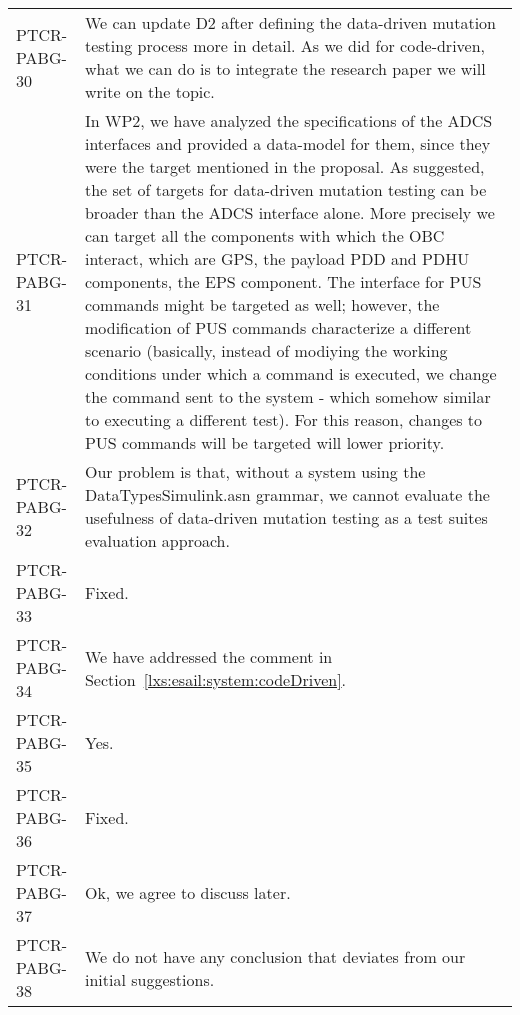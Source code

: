 \begin{longtable}{|p{1.5cm}|p{12cm}|@{}}
\begin{minipage}{12cm}
\end{minipage}\\
\hline
PTCR-PABG-30&
\begin{minipage}{12cm}
We can update D2 after defining the data-driven mutation testing process more in detail. As we did for code-driven, what we can do is to integrate the research paper we will write on the topic.
\end{minipage}\\
\hline
PTCR-PABG-31&
\begin{minipage}{12cm}
In WP2, we have analyzed the specifications of the ADCS interfaces and provided a data-model for them, since they were the target mentioned in the proposal. As suggested, the set of targets for data-driven mutation testing can be broader than the ADCS interface alone. More precisely we can target all the components with which the OBC interact, which are GPS, the payload PDD and PDHU components, the EPS component. The interface for PUS commands might be targeted as well; however, the modification of PUS commands characterize a different scenario (basically,  instead of modiying the working conditions under which a command is executed, we change the command sent to the system - which somehow similar to executing a different test). For this reason, changes to PUS commands will be targeted will lower priority.
\end{minipage}\\
\hline
PTCR-PABG-32&
\begin{minipage}{12cm}
Our problem is that, without a system using the DataTypesSimulink.asn grammar, we cannot evaluate the usefulness of data-driven mutation testing as a test suites evaluation approach.
\end{minipage}\\
\hline
PTCR-PABG-33&
\begin{minipage}{12cm}
Fixed.
\end{minipage}\\
\hline
PTCR-PABG-34&
\begin{minipage}{12cm}
We have addressed the comment in Section~\ref{lxs:esail:system:codeDriven}.
\end{minipage}\\
\hline
PTCR-PABG-35&
\begin{minipage}{12cm}
Yes.
\end{minipage}\\
\hline
PTCR-PABG-36&
\begin{minipage}{12cm}
Fixed.
\end{minipage}\\
\hline
PTCR-PABG-37&
\begin{minipage}{12cm}
Ok, we agree to discuss later.
\end{minipage}\\
\hline
PTCR-PABG-38&
\begin{minipage}{12cm}
We do not have any conclusion that deviates from our initial suggestions.
\end{minipage}\\
\hline

\end{longtable}
\normalsize

\clearpage
